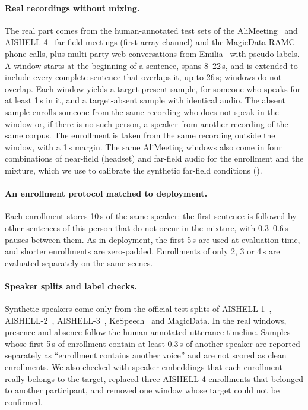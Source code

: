 \paragraph{Real recordings without mixing.}
The real part comes from the human-annotated test sets of the AliMeeting~\cite{yu2022m2met} and AISHELL-4~\cite{fu2021aishell4} far-field meetings (first array channel) and the MagicData-RAMC~\cite{yang2022open} phone calls, plus multi-party web conversations from Emilia~\cite{he2024emilia} with pseudo-labels.
A window starts at the beginning of a sentence, spans 8--22\,s, and is extended to include every complete sentence that overlaps it, up to 26\,s; windows do not overlap.
Each window yields a target-present sample, for someone who speaks for at least 1\,s in it, and a target-absent sample with identical audio.
The absent sample enrolls someone from the same recording who does not speak in the window or, if there is no such person, a speaker from another recording of the same corpus.
The enrollment is taken from the same recording outside the window, with a 1\,s margin.
The same AliMeeting windows also come in four combinations of near-field (headset) and far-field audio for the enrollment and the mixture, which we use to calibrate the synthetic far-field conditions ().

\paragraph{An enrollment protocol matched to deployment.}
Each enrollment stores 10\,s of the same speaker: the first sentence is followed by other sentences of this person that do not occur in the mixture, with 0.3--0.6\,s pauses between them.
As in deployment, the first 5\,s are used at evaluation time, and shorter enrollments are zero-padded.
Enrollments of only 2, 3 or 4\,s are evaluated separately on the same scenes.

\paragraph{Speaker splits and label checks.}
Synthetic speakers come only from the official test splits of AISHELL-1~\cite{bu2017aishell1}, AISHELL-2~\cite{du2018aishell2}, AISHELL-3~\cite{shi2021aishell3}, KeSpeech~\cite{tang2021kespeech} and MagicData.
In the real windows, presence and absence follow the human-annotated utterance timeline.
Samples whose first 5\,s of enrollment contain at least 0.3\,s of another speaker are reported separately as ``enrollment contains another voice'' and are not scored as clean enrollments.
We also checked with speaker embeddings that each enrollment really belongs to the target, replaced three AISHELL-4 enrollments that belonged to another participant, and removed one window whose target could not be confirmed.

